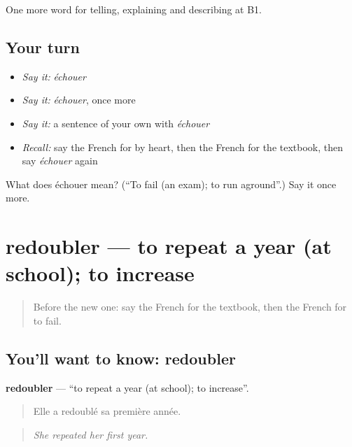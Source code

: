\begin{grammarlens}[title={What you've built}]
One more word for telling, explaining and describing at B1.
\end{grammarlens}

\subsection*{Your turn}
\begin{itemize}
\raggedright
  \item \emph{Say it:} \emph{échouer}
  \item \emph{Say it:} \emph{échouer}, once more
  \item \emph{Say it:} a sentence of your own with \emph{échouer}
  \item \emph{Recall:} say the French for by heart, then the French for the textbook, then say \emph{échouer} again
\end{itemize}

\begin{tcolorbox}[breakable,colback=teal!4,colframe=teal!35!black,title={Before you move on}]
What does échouer mean? (\textquotedblleft{}To fail (an exam); to run aground\textquotedblright{}.) Say it once more.
\end{tcolorbox}
\section[redoubler]{redoubler — to repeat a year (at school); to increase}

\label{lesson:FR-C378-redoubler}



\begin{quote}
Before the new one: say the French for the textbook, then the French for to fail.
\end{quote}

\subsection*{You'll want to know: redoubler}
\textbf{redoubler} — \textquotedblleft{}to repeat a year (at school); to increase\textquotedblright{}.

\begin{quote}
Elle a redoublé sa première année.
\end{quote}

\begin{quote}
\emph{She repeated her first year.}
\end{quote}

